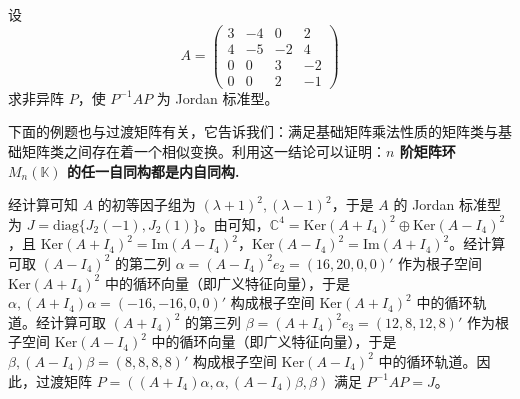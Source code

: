 \documentclass[../../main.tex]{subfiles}%
\begin{document}
\begin{example}
设
\[
A = \begin{pmatrix}
3 & -4 & 0 & 2 \\
4 & -5 & -2 & 4 \\
0 & 0 & 3 & -2 \\
0 & 0 & 2 & -1
\end{pmatrix}
\]
求非异阵 $P$，使 $P^{-1}AP$ 为 Jordan 标准型。
\end{example}
\begin{remark}
下面的例题也与过渡矩阵有关，它告诉我们：满足基础矩阵乘法性质的矩阵类与基础矩阵类之间存在着一个相似变换。利用这一结论可以证明：\textbf{$n$ 阶矩阵环 $M_n(\mathbb{K})$ 的任一自同构都是内自同构.}
\end{remark}
\begin{solution}
经计算可知 $A$ 的初等因子组为 $(\lambda + 1)^2,(\lambda - 1)^2$，于是 $A$ 的 Jordan 标准型为 $J = \mathrm{diag}\{J_2(-1),J_2(1)\}$。由可知，$\mathbb{C}^4 = \mathrm{Ker}(A + I_4)^2 \oplus \mathrm{Ker}(A - I_4)^2$，且 $\mathrm{Ker}(A + I_4)^2 = \mathrm{Im}(A - I_4)^2$，$\mathrm{Ker}(A - I_4)^2 = \mathrm{Im}(A + I_4)^2$。经计算可取 $(A - I_4)^2$ 的第二列 $\alpha = (A - I_4)^2e_2 = (16,20,0,0)'$ 作为根子空间 $\mathrm{Ker}(A + I_4)^2$ 中的循环向量（即广义特征向量），于是 $\alpha,(A + I_4)\alpha = (-16,-16,0,0)'$ 构成根子空间 $\mathrm{Ker}(A + I_4)^2$ 中的循环轨道。经计算可取 $(A + I_4)^2$ 的第三列 $\beta = (A + I_4)^2e_3 = (12,8,12,8)'$ 作为根子空间 $\mathrm{Ker}(A - I_4)^2$ 中的循环向量（即广义特征向量），于是 $\beta,(A - I_4)\beta = (8,8,8,8)'$ 构成根子空间 $\mathrm{Ker}(A - I_4)^2$ 中的循环轨道。因此，过渡矩阵 $P = ((A + I_4)\alpha,\alpha,(A - I_4)\beta,\beta)$ 满足 $P^{-1}AP = J$。

\end{solution}
\end{document}
